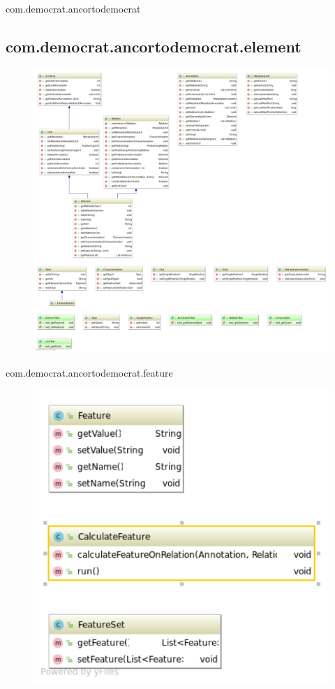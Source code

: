 \documentclass[a4paper,10pt]{report}
\begin{document}
\begin{section}{com.democrat.ancortodemocrat}
  \subsection{com.democrat.ancortodemocrat.element}
     \begin{figure}[!htbp]      
      \advance\leftskip-4cm
      \includegraphics[width=1.6\linewidth, keepaspectratio]{Package_element.pdf}
     \end{figure}
  
  \pagebreak
  \begin{subsection}{com.democrat.ancortodemocrat.feature}  
     \begin{figure}[!htbp]      
\centering	
      \includegraphics[width=0.7\linewidth, keepaspectratio]{Package_feature.pdf}
     \end{figure}
     \vfill
  \end{subsection}
  

\end{section}
\end{document}
